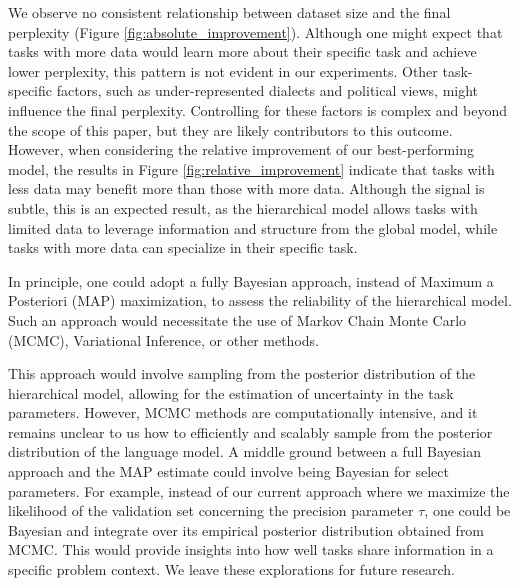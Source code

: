 \documentclass[fullpaper,final]{nldl}
\begin{document}
We observe no consistent relationship between dataset size and the final perplexity (Figure \ref{fig:absolute_improvement}). Although one might expect that tasks with more data would learn more about their specific task and achieve lower perplexity, this pattern is not evident in our experiments. Other task-specific factors, such as under-represented dialects and political views, might influence the final perplexity. Controlling for these factors is complex and beyond the scope of this paper, but they are likely contributors to this outcome.
However, when considering the relative improvement of our best-performing model, the results in Figure \ref{fig:relative_improvement} indicate that tasks with less data may benefit more than those with more data. Although the signal is subtle, this is an expected result, as the hierarchical model allows tasks with limited data to leverage information and structure from the global model, while tasks with more data can specialize in their specific task.

In principle, one could adopt a fully Bayesian approach, instead of Maximum a Posteriori (MAP) maximization, to assess the reliability of the hierarchical model. Such an approach would necessitate the use of Markov Chain Monte Carlo (MCMC), Variational Inference, or other methods.

This approach would involve sampling from the posterior distribution of the hierarchical model, allowing for the estimation of uncertainty in the task parameters. However, MCMC methods are computationally intensive, and it remains unclear to us how to efficiently and scalably sample from the posterior distribution of the language model.
A middle ground between a full Bayesian approach and the MAP estimate could involve being Bayesian for select parameters. For example, instead of our current approach where we maximize the likelihood of the validation set concerning the precision parameter $\tau$, one could be Bayesian and integrate over its empirical posterior distribution obtained from MCMC. This would provide insights into how well tasks share information in a specific problem context.
We leave these explorations for future research.
\end{document}

